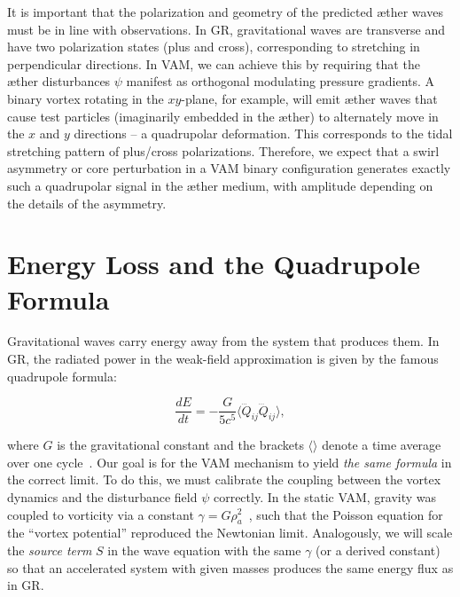 It is important that the polarization and geometry of the predicted æther waves must be in line with observations. In GR, gravitational waves are transverse and have two polarization states (plus and cross), corresponding to stretching in perpendicular directions. In VAM, we can achieve this by requiring that the æther disturbances $ψ$ manifest as orthogonal modulating pressure gradients. A binary vortex rotating in the $xy$-plane, for example, will emit æther waves that cause test particles (imaginarily embedded in the æther) to alternately move in the $x$ and $y$ directions – a quadrupolar deformation. This corresponds to the tidal stretching pattern of plus/cross polarizations. Therefore, we expect that a swirl asymmetry or core perturbation in a VAM binary configuration generates exactly such a quadrupolar signal in the æther medium, with amplitude depending on the details of the asymmetry.

\section*{Energy Loss and the Quadrupole Formula}
Gravitational waves carry energy away from the system that produces them. In GR, the radiated power in the weak-field approximation is given by the famous quadrupole formula:

\[
\frac{dE}{dt} = -\frac{G}{5c^5} \langle \dddot{Q}_{ij} \dddot{Q}_{ij} \rangle,
\]

where $G$ is the gravitational constant and the brackets $\langle \rangle$ denote a time average over one cycle~\cite{iskandarani2025VAM3}. Our goal is for the VAM mechanism to yield \textit{the same formula} in the correct limit. To do this, we must calibrate the coupling between the vortex dynamics and the disturbance field $ψ$ correctly. In the static VAM, gravity was coupled to vorticity via a constant $γ = G ρ_a^2$~\cite{iskandarani2025VAM2}, such that the Poisson equation for the “vortex potential” reproduced the Newtonian limit. Analogously, we will scale the \textit{source term} $S$ in the wave equation with the same $γ$ (or a derived constant) so that an accelerated system with given masses produces the same energy flux as in GR.

